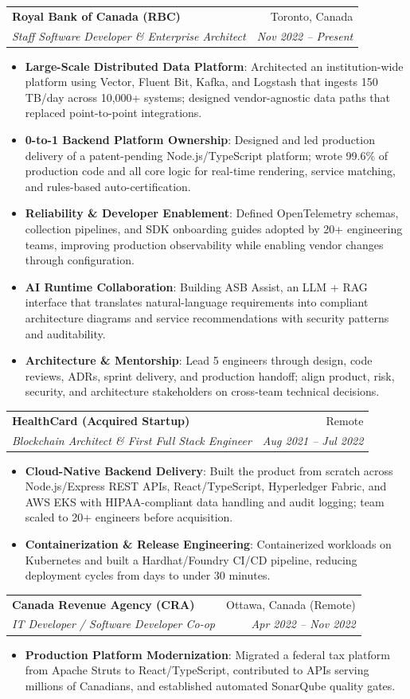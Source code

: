 \documentclass[letterpaper,9.5pt]{article}
\makeatletter
\newcommand{\resumeItem}[2]{\item\small{\textbf{#1}{: #2 \vspace{-2pt}}}}
\newcommand{\resumeSubheading}[4]{\vspace{-2pt}\item\begin{tabular*}{0.97\textwidth}{l@{\extracolsep{\fill}}r}\textbf{#1} & #2 \\\textit{\small#3} & \textit{\small #4} \\\end{tabular*}\vspace{-6pt}}
\newcommand{\resumeItemListStart}{\begin{itemize}}
\newcommand{\resumeItemListEnd}{\end{itemize}\vspace{-6pt}}
\makeatother
\begin{document}
  \resumeSubheading
    {Royal Bank of Canada (RBC)}{Toronto, Canada}
    {Staff Software Developer \& Enterprise Architect}{Nov 2022 -- Present}
  \resumeItemListStart
    \resumeItem{Large-Scale Distributed Data Platform}
      {Architected an institution-wide platform using Vector, Fluent Bit, Kafka, and Logstash that ingests 150\,TB/day across 10,000+ systems; designed vendor-agnostic data paths that replaced point-to-point integrations.}
    \resumeItem{0-to-1 Backend Platform Ownership}
      {Designed and led production delivery of a patent-pending Node.js/TypeScript platform; wrote 99.6\% of production code and all core logic for real-time rendering, service matching, and rules-based auto-certification.}
    \resumeItem{Reliability \& Developer Enablement}
      {Defined OpenTelemetry schemas, collection pipelines, and SDK onboarding guides adopted by 20+ engineering teams, improving production observability while enabling vendor changes through configuration.}
    \resumeItem{AI Runtime Collaboration}
      {Building ASB Assist, an LLM + RAG interface that translates natural-language requirements into compliant architecture diagrams and service recommendations with security patterns and auditability.}
    \resumeItem{Architecture \& Mentorship}
      {Lead 5 engineers through design, code reviews, ADRs, sprint delivery, and production handoff; align product, risk, security, and architecture stakeholders on cross-team technical decisions.}
  \resumeItemListEnd

  \resumeSubheading
    {HealthCard (Acquired Startup)}{Remote}
    {Blockchain Architect \& First Full Stack Engineer}{Aug 2021 -- Jul 2022}
  \resumeItemListStart
    \resumeItem{Cloud-Native Backend Delivery}
      {Built the product from scratch across Node.js/Express REST APIs, React/TypeScript, Hyperledger Fabric, and AWS EKS with HIPAA-compliant data handling and audit logging; team scaled to 20+ engineers before acquisition.}
    \resumeItem{Containerization \& Release Engineering}
      {Containerized workloads on Kubernetes and built a Hardhat/Foundry CI/CD pipeline, reducing deployment cycles from days to under 30 minutes.}
  \resumeItemListEnd

  \resumeSubheading
    {Canada Revenue Agency (CRA)}{Ottawa, Canada (Remote)}
    {IT Developer / Software Developer Co-op}{Apr 2022 -- Nov 2022}
  \resumeItemListStart
    \resumeItem{Production Platform Modernization}
      {Migrated a federal tax platform from Apache Struts to React/TypeScript, contributed to APIs serving millions of Canadians, and established automated SonarQube quality gates.}
  \resumeItemListEnd
\end{document}
